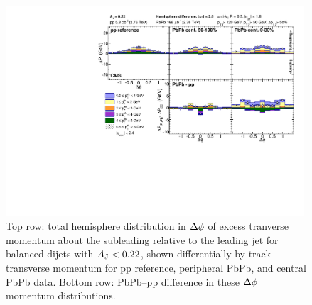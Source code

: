 \begin{figure}[h!]
\begin{center} 
\includegraphics[width=0.99\textwidth]{figures/Results/Missing_pT_NoBkgSub_Aj0_Aj22.pdf}
\caption[Dijet subleading-to-leading hemisphere momentum balance for balanced dijets]{Top row:  total hemisphere distribution in $\protect\Delta\phi$ of excess tranverse momentum about the subleading relative to the leading jet for balanced dijets with $A_{\rm J} < 0.22$, shown differentially by track transverse momentum for pp reference, peripheral PbPb, and central PbPb data.  Bottom row:  PbPb--pp difference in these $\protect\Delta\phi$ momentum distributions.}
\label{fig:MpT_nobkgsub_Aj0_Aj22} 
\end{center} 
\end{figure} 

